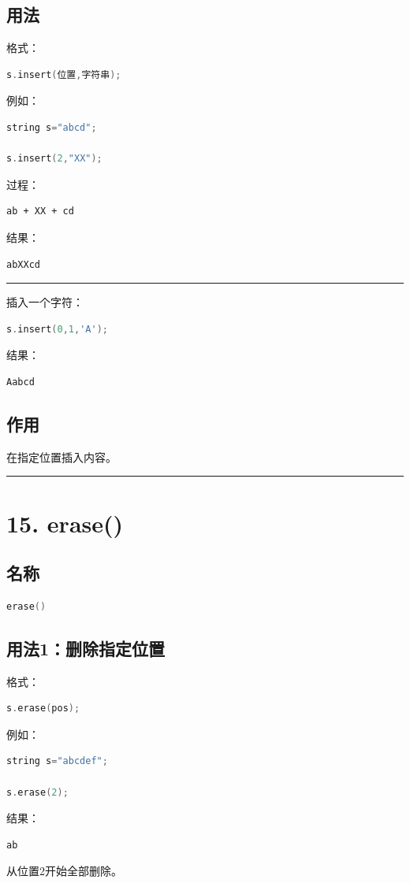 \documentclass[9pt,twocolumn]{extarticle}
\begin{document}
\subsection{用法}
格式：
\begin{lstlisting}[language=C++]
s.insert(位置,字符串);
\end{lstlisting}
例如：
\begin{lstlisting}[language=C++]
string s="abcd";

s.insert(2,"XX");
\end{lstlisting}
过程：
\begin{lstlisting}
ab + XX + cd
\end{lstlisting}
结果：
\begin{lstlisting}
abXXcd
\end{lstlisting}

\noindent\rule{\linewidth}{0.4pt}

插入一个字符：
\begin{lstlisting}[language=C++]
s.insert(0,1,'A');
\end{lstlisting}
结果：
\begin{lstlisting}
Aabcd
\end{lstlisting}

\subsection{作用}
在指定位置插入内容。

\noindent\rule{\linewidth}{0.4pt}

\section{15. erase()}

\subsection{名称}
\begin{lstlisting}[language=C++]
erase()
\end{lstlisting}

\subsection{用法1：删除指定位置}
格式：
\begin{lstlisting}[language=C++]
s.erase(pos);
\end{lstlisting}
例如：
\begin{lstlisting}[language=C++]
string s="abcdef";

s.erase(2);
\end{lstlisting}
结果：
\begin{lstlisting}
ab
\end{lstlisting}
从位置2开始全部删除。
\end{document}
